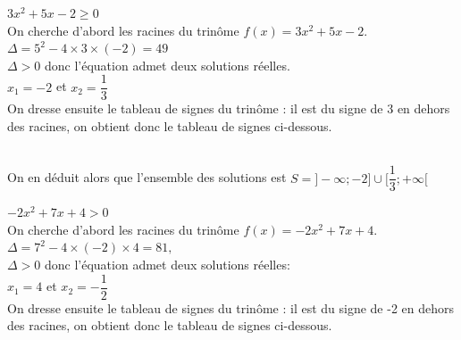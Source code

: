 \documentclass[12pt,a4paper]{book}
\begin{document}
\begin{enumMet}
    \item $3 x^{2}+5 x-2 \geqslant 0$\\
    On cherche d'abord les racines du trinôme $f(x)=3 x^{2}+5 x-2$. \\
    $\Delta=5^{2}-4 \times 3 \times(-2)=49$ \\
    $\Delta>0$ donc l'équation admet deux solutions réelles.\\ 
    $x_{1}=-2$ et $x_{2}=\dfrac{1}{3}$ \\
    On dresse ensuite le tableau de signes du trinôme : il est du signe de 3 en dehors des racines, on obtient donc le tableau de signes ci-dessous.\\
    
    \\
    
    On en déduit alors que l'ensemble des solutions est $S=\bigg]-\infty ;-2\bigg]\cup\bigg[ \dfrac{1}{3} ;+\infty\bigg[$
    \item $-2 x^{2}+7 x+4>0$\\
    On cherche d'abord les racines du trinôme $f(x)=-2 x^{2}+7 x+4$.\\
    $\Delta=7^{2}-4 \times(-2) \times 4=81,$ \\
    $\Delta>0$ donc l'équation admet deux solutions réelles:\\
    $x_{1}=4$ et $x_{2}=-\dfrac{1}{2}$\\
    On dresse ensuite le tableau de signes du trinôme : il est du signe de -2 en dehors des racines, on obtient donc le tableau de signes ci-dessous.\\
    
    \\
    

\end{enumMet}
\end{document}
